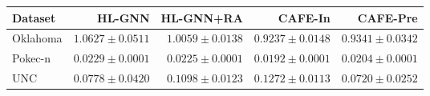 \begin{tabular}{lrrrr}
\toprule
Dataset & HL-GNN & HL-GNN+RA & CAFE-In & CAFE-Pre \\
\midrule
Oklahoma & $1.0627 \pm 0.0511$ & $1.0059 \pm 0.0138$ & $0.9237 \pm 0.0148$ & $0.9341 \pm 0.0342$ \\
Pokec-n & $0.0229 \pm 0.0001$ & $0.0225 \pm 0.0001$ & $0.0192 \pm 0.0001$ & $0.0204 \pm 0.0001$ \\
UNC & $0.0778 \pm 0.0420$ & $0.1098 \pm 0.0123$ & $0.1272 \pm 0.0113$ & $0.0720 \pm 0.0252$ \\
\bottomrule
\end{tabular}
